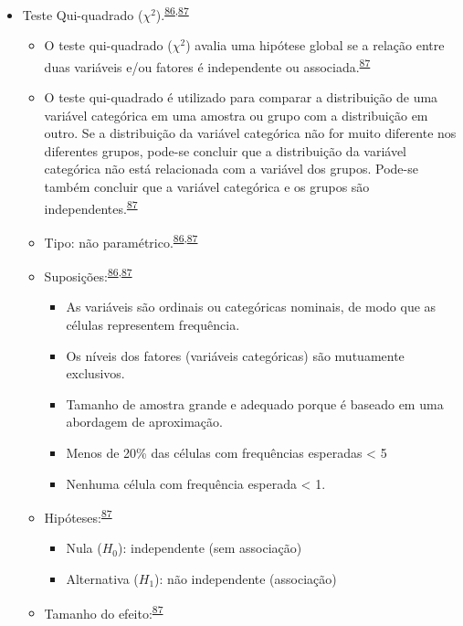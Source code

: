 \documentclass[
]{book}
\begin{document}
\begin{itemize}
\item
  Teste Qui-quadrado (\(\chi^2\)).\textsuperscript{\protect\hyperlink{ref-McHugh2013}{86},\protect\hyperlink{ref-Kim2017a}{87}}

  \begin{itemize}
  \item
    O teste qui-quadrado (\(\chi^2\)) avalia uma hipótese global se a relação entre duas variáveis e/ou fatores é independente ou associada.\textsuperscript{\protect\hyperlink{ref-Kim2017a}{87}}
  \item
    O teste qui-quadrado é utilizado para comparar a distribuição de uma variável categórica em uma amostra ou grupo com a distribuição em outro. Se a distribuição da variável categórica não for muito diferente nos diferentes grupos, pode-se concluir que a distribuição da variável categórica não está relacionada com a variável dos grupos. Pode-se também concluir que a variável categórica e os grupos são independentes.\textsuperscript{\protect\hyperlink{ref-Kim2017a}{87}}
  \item
    Tipo: não paramétrico.\textsuperscript{\protect\hyperlink{ref-McHugh2013}{86},\protect\hyperlink{ref-Kim2017a}{87}}
  \item
    Suposições:\textsuperscript{\protect\hyperlink{ref-McHugh2013}{86},\protect\hyperlink{ref-Kim2017a}{87}}

    \begin{itemize}
    \item
      As variáveis são ordinais ou categóricas nominais, de modo que as células representem frequência.
    \item
      Os níveis dos fatores (variáveis categóricas) são mutuamente exclusivos.
    \item
      Tamanho de amostra grande e adequado porque é baseado em uma abordagem de aproximação.
    \item
      Menos de 20\% das células com frequências esperadas \textless{} 5
    \item
      Nenhuma célula com frequência esperada \textless{} 1.
    \end{itemize}
  \item
    Hipóteses:\textsuperscript{\protect\hyperlink{ref-Kim2017a}{87}}

    \begin{itemize}
    \item
      Nula (\(H_{0}\)): independente (sem associação)
    \item
      Alternativa (\(H_{1}\)): não independente (associação)
    \end{itemize}
  \item
    Tamanho do efeito:\textsuperscript{\protect\hyperlink{ref-Kim2017a}{87}}


\end{itemize}
\end{itemize}
\end{document}

